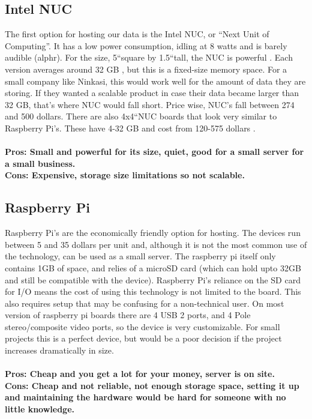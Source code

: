 \documentclass[draftclsnofoot,onecolumn,letterpaper,10pt,compsoc]{IEEEtran}
\begin{document}
			\subsection{Intel NUC}
		            The first option for hosting our data is the Intel NUC, or “Next Unit of Computing”.
								It has a low power consumption, idling at 8 watts and is barely audible (alphr). For the size, 5\textquotedblleft square by 1.5\textquotedblleft tall, the NUC is powerful \cite{IntelNUCReview}.
								Each version averages around 32 GB \cite{Intel}, but this is a fixed-size memory space.
								For a small company like Ninkasi, this would work well for the amount of data they are storing.
								If they wanted a scalable product in case their data became larger than 32 GB, that’s where NUC would fall short.
								Price wise, NUC's  fall between 274 and 500 dollars\cite{PCWorld}.
								There are also 4x4\textquotedblleft NUC boards that look very similar to Raspberry Pi's.
								These have 4-32 GB and cost from 120-575 dollars \cite{Intel}.
						\\ \\
						\textbf{Pros: Small and powerful for its size, quiet, good for a small server for a small business.}
						\\
		        \textbf{Cons: Expensive, storage size limitations so not scalable.}

			\subsection{Raspberry Pi}
					Raspberry Pi's are the economically friendly option for hosting.
					The devices run between 5 and 35 dollars per unit and, although it is not the most common use of the technology, can be used as a small server\cite{CopaHost}.
					The raspberry pi itself only contains 1GB of space, and relies of a microSD card (which can hold upto 32GB and still be compatible with the device)\cite{CopaHost}.
					Raspberry Pi’s reliance on the SD card for I/O means the cost of using this technology is not limited to the board.
					This also requires setup that may be confusing for a non-technical user.
					On most version of raspberry pi boards there are 4 USB 2 ports, and 4 Pole stereo/composite video ports\cite{RaspberryPi}, so the device is very customizable.
					For small projects this is a perfect device, but would be a poor decision if the project increases dramatically in size.
					\\\\
					\textbf{Pros: Cheap and you get a lot for your money, server is on site.}
					\\
					\textbf{Cons: Cheap and not reliable, not enough storage space, setting it up and maintaining the hardware would be hard for someone with no little knowledge.}
\end{document}
